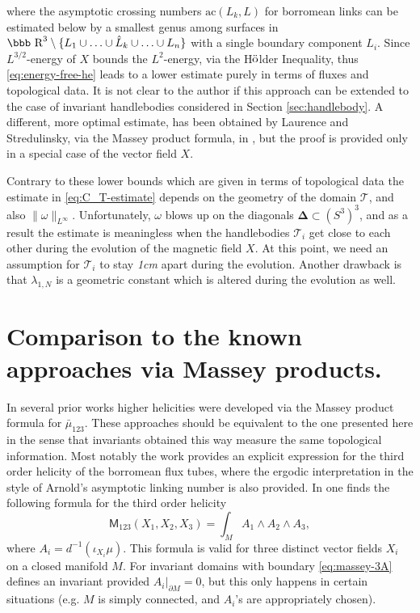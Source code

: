 \documentclass[12pt]{article}
\newcommand{\R}{\mbox{\bbb R}}       %
\begin{document}
where the asymptotic crossing numbers $\text{ac}(L_k,L)$  for borromean links can be estimated below by
a smallest genus among surfaces in $\R^3\setminus \{L_1\cup\ldots\cup\hat{L}_k\cup\ldots\cup L_n\}$
with a single boundary component $L_i$.  Since $L^{3/2}$-energy of $X$ bounds the $L^2$-energy, via the H$\ddot{\rm o}$lder Inequality, thus 
\eqref{eq:energy-free-he} leads to a lower estimate purely in terms of fluxes and topological data.
It is not clear to the author if this approach can be extended to the case of invariant handlebodies 
considered in Section \ref{sec:handlebody}.
A different, more optimal estimate, has been obtained by Laurence and Stredulinsky, via the Massey product formula, in \cite{Laurence-Stredulinsky00a}, but the proof is provided only in a special case of the vector field $X$.

Contrary to these lower bounds which are given in terms of topological data the estimate in \eqref{eq:C_T-estimate} depends on the geometry of the domain $\mathcal{T}$, and also $\|\omega\|_{L^\infty}$. Unfortunately, $\omega$ blows up on the diagonals $\mathbf{\Delta}\subset (S^3)^3$, and as a result the estimate is meaningless when the handlebodies 
$\mathcal{T}_i$ get close to each other during the evolution of the magnetic field $X$. At this point, we need an assumption for $\mathcal{T}_i$ to stay \emph{1cm} apart during the evolution.
Another drawback is that $\lambda_{1,N}$ is a geometric constant which is altered during the evolution as well. 





\section{Comparison to the known approaches via Massey products.}\label{sec:massey}

In several prior works \cite{Berger90, Berger-Evans92, Laurence-Stredulinsky00b, Mayer03} higher helicities were developed via the Massey product formula for $\bar{\mu}_{123}$. These approaches should be equivalent to the one presented here in the sense that invariants obtained this way measure the same topological information. Most notably the work \cite{Laurence-Stredulinsky00b} provides an explicit expression for the third order helicity of the borromean flux tubes, where the ergodic interpretation in the style of Arnold's asymptotic linking number is also provided.  In  \cite{Mayer03} one finds the following formula for the third order helicity
\begin{equation}\label{eq:massey-3A}
 \mathsf{M}_{123}(X_1,X_2,X_3)=\int_M A_1\wedge A_2\wedge A_3,
\end{equation}
where $A_i=d^{-1}(\iota_{X_i}\mu)$. This formula is valid for three distinct vector fields $X_i$
on a closed manifold $M$. For invariant domains with boundary 
\eqref{eq:massey-3A} defines an invariant provided $A_i\bigl|_{\partial M}=0$, but this only happens in certain situations (e.g. $M$ is simply connected, and $A_i$'s are appropriately chosen). 
\end{document}
